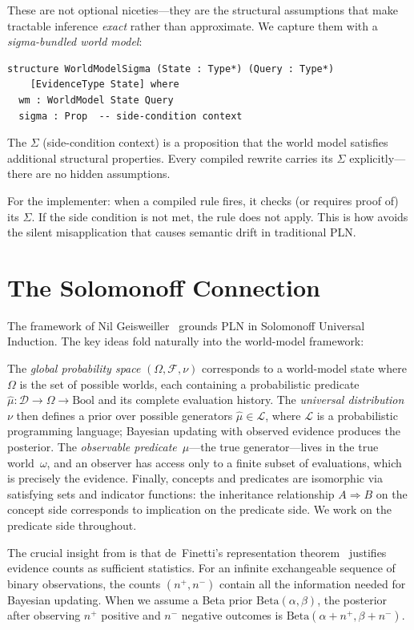 \documentclass[11pt,openany]{report}
\begin{document}
These are not optional niceties---they are the structural assumptions that
make tractable inference \emph{exact} rather than approximate.  We capture
them with a \emph{sigma-bundled world model}:

\begin{lstlisting}
structure WorldModelSigma (State : Type*) (Query : Type*)
    [EvidenceType State] where
  wm : WorldModel State Query
  sigma : Prop  -- side-condition context
\end{lstlisting}

The $\Sigma$ (side-condition context) is a proposition that the world model
satisfies additional structural properties.  Every compiled rewrite carries
its $\Sigma$ explicitly---there are no hidden assumptions.

For the implementer: when a compiled rule fires, it checks (or requires
proof of) its $\Sigma$.  If the side condition is not met, the rule does not
apply.  This is how \xiPLN{} avoids the silent misapplication that causes
semantic drift in traditional PLN.

\section{The Solomonoff Connection}

The \nuPLN{} framework of Nil Geisweiller~\cite{nuPLN2026} grounds PLN in
Solomonoff Universal Induction.  The key ideas fold naturally into the
world-model framework:

The \emph{global probability space} $(\Omega, \mathcal{F}, \nu)$
corresponds to a world-model state where $\Omega$ is the set of possible
worlds, each containing a probabilistic predicate
$\hat{\mu} : \mathcal{D} \to \Omega \to \mathrm{Bool}$ and its complete
evaluation history.  The \emph{universal distribution} $\nu$ then defines
a prior over possible generators $\hat{\mu} \in \mathcal{L}$, where
$\mathcal{L}$ is a probabilistic programming language; Bayesian updating
with observed evidence produces the posterior.  The \emph{observable
predicate}~$\mu$---the true generator---lives in the true world~$\omega$,
and an observer has access only to a finite subset of evaluations, which
is precisely the evidence.  Finally, concepts and predicates are isomorphic
via satisfying sets and indicator functions: the inheritance relationship
$A \Rightarrow B$ on the concept side corresponds to implication on the
predicate side.  We work on the predicate side throughout.

The crucial insight from \nuPLN{} is that de~Finetti's representation
theorem~\cite{definetti1937} justifies evidence counts as sufficient
statistics.  For an infinite exchangeable sequence of binary observations,
the counts $(n^+, n^-)$ contain all the information needed for Bayesian
updating.  When we assume a Beta prior $\text{Beta}(\alpha, \beta)$, the
posterior after observing $n^+$ positive and $n^-$ negative outcomes is
$\text{Beta}(\alpha + n^+, \beta + n^-)$.
\end{document}
